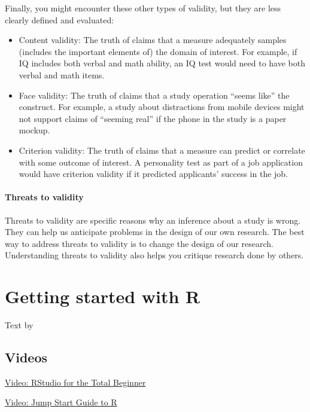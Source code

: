 \documentclass[
]{book}
\providecommand{\tightlist}{%
  \setlength{\itemsep}{0pt}\setlength{\parskip}{0pt}}
\begin{document}
Finally, you might encounter these other types of validity, but they are less clearly defined and evaluated:

\begin{itemize}
\tightlist
\item
  Content validity: The truth of claims that a measure adequately samples (includes the important elements of) the domain of interest. For example, if IQ includes both verbal and math ability, an IQ test would need to have both verbal and math items.
\item
  Face validity: The truth of claims that a study operation ``seems like'' the construct. For example, a study about distractions from mobile devices might not support claims of ``seeming real'' if the phone in the study is a paper mockup.
\item
  Criterion validity: The truth of claims that a measure can predict or correlate with some outcome of interest. A personality test as part of a job application would have criterion validity if it predicted applicants' success in the job.
\end{itemize}

\hypertarget{threats-to-validity}{%
\subsubsection{Threats to validity}\label{threats-to-validity}}

Threats to validity are specific reasons why an inference about a study is wrong. They can help us anticipate problems in the design of our own research. The best way to address threats to validity is to change the design of our research. Understanding threats to validity also helps you critique research done by others.

\hypertarget{introR}{%
\chapter{Getting started with R}\label{introR}}

Text by \citet{Navarro2018}

\hypertarget{videos}{%
\section{Videos}\label{videos}}

\href{https://www.youtube.com/watch?v=FIrsOBy5k58}{Video: RStudio for the Total Beginner}

\href{https://youtu.be/PVK092WlC4A}{Video: Jump Start Guide to R}
\end{document}
